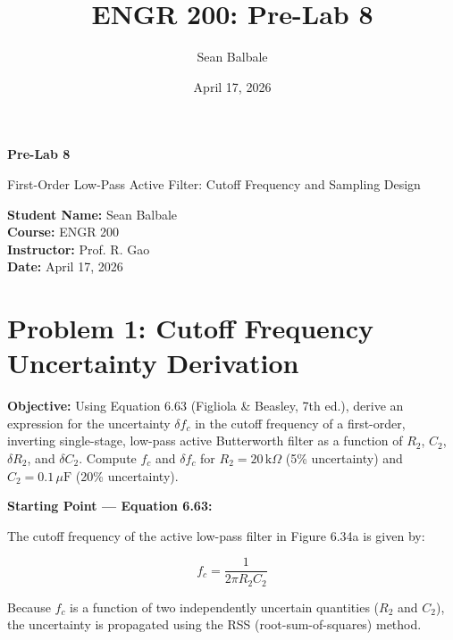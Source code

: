 \documentclass[11pt]{article}
\title{ENGR 200: Pre-Lab 8}
\author{Sean Balbale}
\date{April 17, 2026}
\begin{document}
\begin{titlepage}

  \begin{center}

    \vspace*{1in}

    \Huge

    \textbf{Pre-Lab 8}

    \LARGE

    First-Order Low-Pass Active Filter: Cutoff Frequency and Sampling Design

    \vspace{3in}

    \textbf{Student Name:} Sean Balbale
    \\ \textbf{Course:} ENGR 200
    \\ \textbf{Instructor:} Prof. R. Gao
    \\ \textbf{Date:} April 17, 2026

    \vfill

  \end{center}

\end{titlepage}

\newpage



\section*{Problem 1: Cutoff Frequency Uncertainty Derivation}

\textbf{Objective:} Using Equation 6.63 (Figliola \& Beasley, 7th ed.), derive an expression for the
uncertainty $\delta f_c$ in the cutoff frequency of a first-order, inverting single-stage, low-pass
active Butterworth filter as a function of $R_2$, $C_2$, $\delta R_2$, and $\delta C_2$. Compute
$f_c$ and $\delta f_c$ for $R_2 = 20\,\text{k}\Omega$ (5\% uncertainty) and
$C_2 = 0.1\,\mu\text{F}$ (20\% uncertainty).

\textbf{Starting Point --- Equation 6.63:}

The cutoff frequency of the active low-pass filter in Figure 6.34a is given by:

\[
  f_c = \frac{1}{2\pi R_2 C_2}
\]

Because $f_c$ is a function of two independently uncertain quantities ($R_2$ and $C_2$), the
uncertainty is propagated using the RSS (root-sum-of-squares) method.
\end{document}
